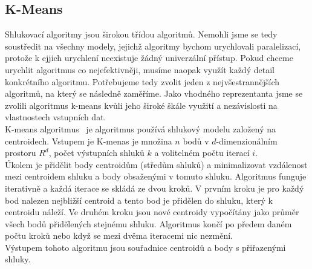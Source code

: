 \subsection{K-Means} 
Shlukovací algoritmy jsou širokou třídou algoritmů. Nemohli jsme se tedy soustředit na všechny modely, jejichž algoritmy bychom urychlovali paralelizací, protože k ejjich urychlení neexistuje žádný univerzální přístup. Pokud chceme urychlit algoritmus co nejefektivněji, musíme naopak využít každý detail konkrétního algoritmu. Potřebujeme tedy zvolit jeden z nejvšestrannějších algoritmů, na který se následně zaměříme. Jako vhodného reprezentanta jsme se zvolili algoritmus k-means kvůli jeho široké škále využití a nezávislosti na vlastnostech vstupních dat. \\
K-means algoritmus~\cite{Aggarwal13, Tan05} je algoritmus používá shlukový modelu založený na centroidech. Vstupem je K-menas je množina $n$ bodů v $d$-dimenzionálním prostoru $R^d$, počet výstupních shluků $k$ a volitelném počtu iterací $ i $. \\
Úkolem je přidělit body centroidům (středům shluků) a minimalizovat vzdálenost mezi centroidem shluku a body obsaženými v tomuto shluku. Algoritmus funguje iterativně a každá iterace se skládá ze dvou kroků. V prvním kroku je pro každý bod nalezen nejbližší centroid a tento bod je přidělen do shluku, který k centroidu náleží. Ve druhém kroku jsou nové centroidy vypočítány jako průměr všech bodů přidělených stejnému shluku. Algoritmus končí po předem daném počtu kroků nebo když se mezi dvěma iteracemi nic nezmění. \\
Výstupem tohoto algoritmu jsou souřadnice centroidů a body s přiřazenými shluky.



